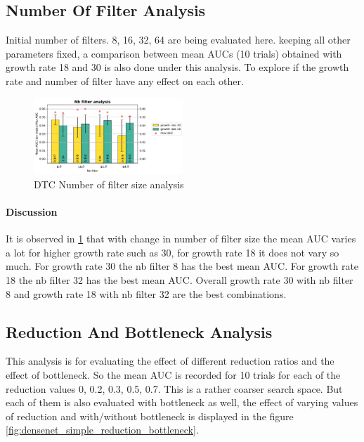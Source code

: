 \subsection{Number Of Filter Analysis}
Initial number of filters. 8, 16, 32, 64 are being evaluated here. keeping all other parameters fixed, a comparison between mean AUCs (10 trials) obtained with growth rate 18 and 30 is also done under this analysis. 
To explore if the growth rate and number of filter have any effect on each other.

\begin{figure}[ht]
\centering
\includegraphics[width=0.5\textwidth]{images/densenet/simple/densenet_simple_nb_filter}
\caption{DTC Number of filter size analysis}
\label{fig:densenet_simple_nb_filter}
\end{figure}

\paragraph{Discussion\\}
It is observed in \ref{fig:densenet_simple_nb_filter} that with change in number of filter size the mean AUC varies a lot for higher growth rate such as 30, for growth rate 18 it does not vary so much. For growth rate 30 the nb 
filter 8 has the best mean AUC. For growth rate 18 the nb filter 32 has the best mean AUC. Overall growth rate 30 with nb filter 8 and growth rate 18 with nb filter 32 are the best combinations.

\subsection{Reduction And Bottleneck Analysis}
This analysis is for evaluating the effect of different reduction ratios and the effect of bottleneck. So the mean AUC is recorded for 10 trials for each of the reduction values 0, 0.2, 0.3, 0.5, 0.7. This is a rather coarser 
search space. But each of them is also evaluated with bottleneck as well, the effect of varying values of reduction and with/without bottleneck is displayed in the figure \ref{fig:densenet_simple_reduction_bottleneck}. 

